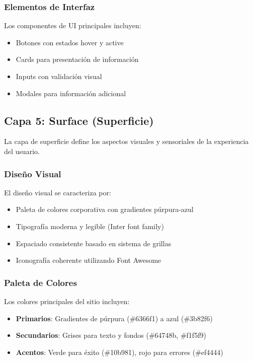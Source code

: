 \subsubsection{Elementos de Interfaz}
Los componentes de UI principales incluyen:

\begin{itemize}
    \item Botones con estados hover y active
    \item Cards para presentación de información
    \item Inputs con validación visual
    \item Modales para información adicional
\end{itemize}

\subsection{Capa 5: Surface (Superficie)}

La capa de superficie define los aspectos visuales y sensoriales de la experiencia del usuario.

\subsubsection{Diseño Visual}
El diseño visual se caracteriza por:

\begin{itemize}
    \item Paleta de colores corporativa con gradientes púrpura-azul
    \item Tipografía moderna y legible (Inter font family)
    \item Espaciado consistente basado en sistema de grillas
    \item Iconografía coherente utilizando Font Awesome
\end{itemize}

\subsubsection{Paleta de Colores}
Los colores principales del sitio incluyen:

\begin{itemize}
    \item \textbf{Primarios}: Gradientes de púrpura (\#6366f1) a azul (\#3b82f6)
    \item \textbf{Secundarios}: Grises para texto y fondos (\#64748b, \#f1f5f9)
    \item \textbf{Acentos}: Verde para éxito (\#10b981), rojo para errores (\#ef4444)
\end{itemize}

